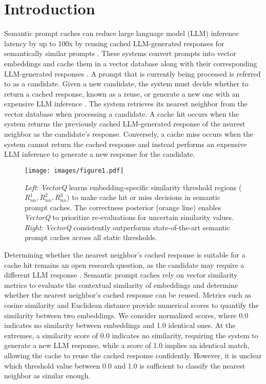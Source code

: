 \section{Introduction}
\label{introduction}
Semantic prompt caches can reduce large language model (LLM) inference latency by up to 100x by reusing cached LLM-generated responses for semantically similar prompts \cite{bang2023gptcache}. These systems convert prompts into vector embeddings and cache them in a vector database along with their corresponding LLM-generated responses \cite{dasgupta2025wallmartcache}. A prompt that is currently being processed is referred to as a candidate. Given a new candidate, the system must decide whether to return a cached response, known as a reuse, or generate a new one with an expensive LLM inference \cite{li2024scalm}. The system retrieves its nearest neighbor from the vector database when processing a candidate. A cache hit occurs when the system returns the previously cached LLM-generated response of the nearest neighbor as the candidate's response. Conversely, a cache miss occurs when the system cannot return the cached response and instead performs an expensive LLM inference to generate a new response for the candidate.

\begin{figure}[t]
    \centering
    \texttt{[image: images/figure1.pdf]}
    \caption{\textit{Left}: \textit{VectorQ} learns embedding-specific similarity threshold regions ($R_{nn}^1, R_{nn}^2, R_{nn}^3$) to make cache hit or miss decisions in semantic prompt caches. The correctness posterior (orange line) enables \textit{VectorQ} to prioritize re-evaluations for uncertain similarity values. \textit{Right}: \textit{VectorQ} consistently outperforms state-of-the-art semantic prompt caches across all static thresholds.}
    \label{fig:figure-1}
\end{figure}

Determining whether the nearest neighbor's cached response is suitable for a cache hit remains an open research question, as the candidate may require a different LLM response \cite{bang2023gptcache, dasgupta2025wallmartcache, li2024scalm}. Semantic prompt caches rely on vector similarity metrics to evaluate the contextual similarity of embeddings and determine whether the nearest neighbor's cached response can be reused. Metrics such as cosine similarity \cite{rahutomo2012semantic} and Euclidean distance \cite{globerson2004euclidean} provide numerical scores to quantify the similarity between two embeddings. We consider normalized scores, where 0.0 indicates no similarity between embeddings and 1.0 identical ones. At the extremes, a similarity score of 0.0 indicates no similarity, requiring the system to generate a new LLM response, while a score of 1.0 implies an identical match, allowing the cache to reuse the cached response confidently. However, it is unclear which threshold value between 0.0 and 1.0 is sufficient to classify the nearest neighbor as similar enough.

